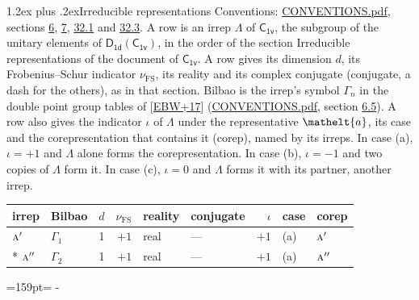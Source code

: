 \documentclass[10pt,a4paper]{article}
\makeatletter
\renewcommand\section{\@startsection{section}{1}{\z@}{-3ex plus -1ex minus -.2ex}%
  {1.2ex plus .2ex}{\normalfont\large\sffamily\bfseries\color{parttitle}}}
\newcommand{\needspace}[1]{\par\penalty-100\begingroup\dimen0=#1\relax\dimen2=\pagegoal
  \advance\dimen2-\pagetotal\ifdim\dimen0>\dimen2\relax\ifdim\dimen2>0pt\vfil\break\fi\fi
  \endgroup}
\numberwithin{equation}{section}
\newcommand{\eltfont}[1]{{\let\sigma\eltsigma\mathelt{#1}}}
\newcommand{\grp}[1]{\mathsf{#1}}
\newcommand{\irr}[1]{\text{\normalfont\scshape #1}}
\newcommand{\elt}[1]{\eltfont{#1}}
\newcommand{\fsind}{\nu_{\mathrm{FS}}}
\makeatother
\begin{document}
\section{Irreducible representations}\label{s:irreps}
Conventions: \href{../../CONVENTIONS.pdf}{CONVENTIONS.pdf}, sections \href{../../../rotation/CONVENTIONS.pdf\#conv.6}{6}, \href{../../../rotation/CONVENTIONS.pdf\#conv.7}{7}, \href{../../CONVENTIONS.pdf\#conv.32.1}{32.1} and \href{../../CONVENTIONS.pdf\#conv.32.3}{32.3}.
\leavevmode\label{n:irrep.Delta}A row is an irrep $\Lambda$ of $\grp{C_{1v}}$, the subgroup of the unitary elements of $\grp{D_{1d}}(\grp{C_{1v}})$, in the order of the section Irreducible representations of the document of \href{../../../rotation/data/pdf/C1v.pdf}{$\grp{C_{1v}}$}. \label{n:index.dimension}\label{n:index.frobenius}\label{n:head.irrep}\label{n:head.reality}\label{n:head.conjugate}A row gives its dimension $d$, its Frobenius--Schur indicator $\fsind$, its reality and its complex conjugate (conjugate, a dash for the others), as in that section. \label{n:head.bilbao}\label{n:irrep.alias.gamma}Bilbao is the irrep's symbol $\Gamma_n$ in the double point group tables of [\href{../../../REFERENCES.pdf\#ref.EBW+17}{EBW+17}] (\href{../../CONVENTIONS.pdf}{CONVENTIONS.pdf}, section \href{../../../rotation/CONVENTIONS.pdf\#conv.6.5}{6.5}). \label{n:head.case.corep}\label{n:head.corep}A row also gives the indicator $\iota$ of $\Lambda$ under the representative $\elt{a}$, its case and the corepresentation that contains it (corep), named by its irreps. In case (a), $\iota = +1$ and $\Lambda$ alone forms the corepresentation. In case (b), $\iota = -1$ and two copies of $\Lambda$ form it. In case (c), $\iota = 0$ and $\Lambda$ forms it with its partner, another irrep.
\setlength{\emergencystretch}{2em}\par\setlength{\emergencystretch}{0pt}
{\small\renewcommand{\arraystretch}{1.25}\setlength{\tabcolsep}{4pt}\begin{longtable}{@{}llrrllrll@{}}\toprule
irrep & Bilbao & $d$ & $\fsind$ & reality & conjugate & $\iota$ & case & corep\\\midrule\endhead
\bottomrule\endfoot\endlastfoot
$\irr{a}'$ & $\Gamma_{1}$ & 1 & $+1$ & real & --- & $+1$ & (a) & $\irr{a}'$\\*
$\irr{a}''$ & $\Gamma_{2}$ & 1 & $+1$ & real & --- & $+1$ & (a) & $\irr{a}''$\\
\bottomrule\end{longtable}}
\needspace{159pt}
\end{document}

